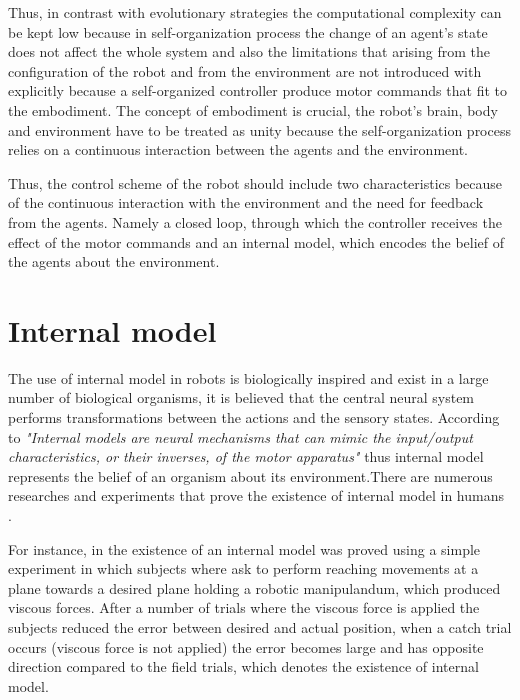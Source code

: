 \documentclass[msc,ai,logo]{infthesis}
\begin{document}
Thus, in contrast with evolutionary strategies the computational complexity can be kept low because in self-organization process the change of an agent's state does not affect the whole system and also the limitations that arising from the configuration of the robot and from the environment are not introduced with explicitly because a self-organized controller produce motor commands that fit to the embodiment. The concept of embodiment is crucial, the robot's brain, body and environment have to be treated as unity \citep{Brooks91} because the self-organization process relies on a continuous interaction between the agents and the environment.

Thus, the control scheme of the robot should include two characteristics because of the continuous interaction with the environment and the need for feedback from the agents. Namely a closed loop, through which the controller receives the effect of the motor commands   and an internal model, which encodes the belief of the agents about the environment.

\section{Internal model}   

The use of internal model in robots is biologically inspired and exist in a large number of biological organisms, it is believed that the central neural system performs transformations between the actions and the sensory states. According to \cite{Kawato1999718} \textit{"Internal models are neural mechanisms that can mimic the input/output characteristics, or their inverses, of the motor apparatus"} thus internal model represents the belief of an organism about its environment.There are numerous researches and experiments that prove the existence of internal model in humans \citep{Wolpert29091995,Flanagan97therole, Thoroughman2000}.

 For instance, in \cite{Thoroughman2000}  the existence of an internal model was proved using a simple experiment in which subjects where ask to perform reaching movements at a plane towards a desired plane holding a robotic manipulandum, which produced viscous forces. After a number of trials where the viscous force is applied the subjects reduced the error between desired and actual position, when a catch trial occurs (viscous force is not applied) the error becomes large and has opposite direction compared to the field trials, which denotes the existence of internal model.
 
\end{document}
